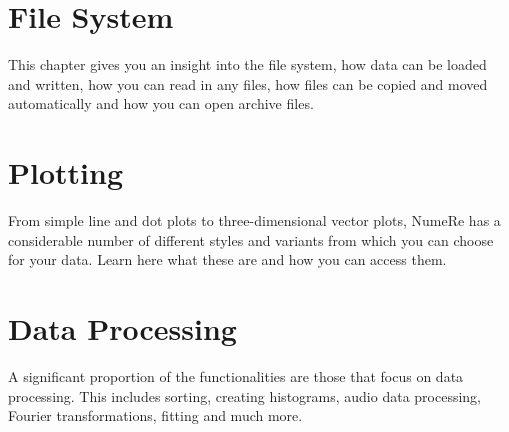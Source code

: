 \documentclass[DIV=17, parskip=half]{scrreprt}
\begin{document}
	\chapter{File System}
		This chapter gives you an insight into the file system, how data can be loaded and written, how you can read in any files, how files can be copied and moved automatically and how you can open archive files.
		
		
		
		
		
		
		
	
	\chapter{Plotting}
		From simple line and dot plots to three-dimensional vector plots, NumeRe has a considerable number of different styles and variants from which you can choose for your data. Learn here what these are and how you can access them.
		
		
		
		
		
		
		
		
		
		
		
		
		
		
		
		
		
	
	\chapter{Data Processing}
		A significant proportion of the functionalities are those that focus on data processing. This includes sorting, creating histograms, audio data processing, Fourier transformations, fitting and much more.
		
		
		
		
		
		
		
		
		
		
		
		
		
		
		
		
		
		
		
		
		
		
	
\end{document}
